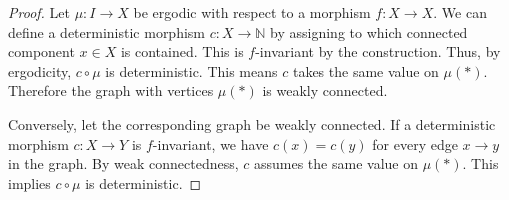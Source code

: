 \documentclass[10pt,a4paper]{amsart}
\begin{document}
\begin{proof}
	Let $\mu: I \to X$ be ergodic with respect to a morphism $f:X \to X$. We can define a deterministic morphism $c: X \to \mathbb{N}$ by assigning to which connected component $x \in X$ is contained. This is $f$-invariant by the construction. Thus, by ergodicity, $c\circ \mu$ is deterministic. This means $c$ takes the same value on $\mu(*)$. Therefore the graph with vertices $\mu(*)$ is weakly connected.
	
	Conversely, let the corresponding graph be weakly connected. If a deterministic morphism $c: X \to Y$ is $f$-invariant, we have $c(x) = c(y)$ for every edge $x \to y$ in the graph. By weak connectedness, $c$ assumes the same value on $\mu(*)$. This implies $c \circ \mu$ is deterministic.
\end{proof}
\end{document}
